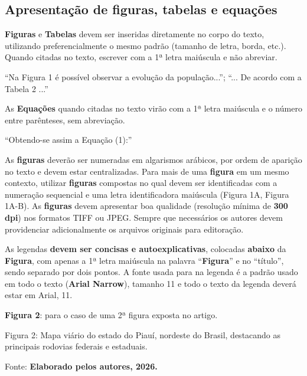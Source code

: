 
\subsection{Apresentação de figuras, tabelas e equações}

\textbf{Figuras} e \textbf{Tabelas} devem ser inseridas diretamente no corpo do texto, utilizando preferencialmente o mesmo padrão (tamanho de letra, borda, etc.). Quando citadas no texto, escrever com a 1ª letra maiúscula e não abreviar.

``Na Figura 1 é possível observar a evolução da população...''; ``... De acordo com a Tabela 2 ...''

As \textbf{Equações} quando citadas no texto virão com a 1ª letra maiúscula e o número entre parênteses, sem abreviação.

``Obtendo-se assim a Equação (1):''

As \textbf{figuras} deverão ser numeradas em algarismos arábicos, por ordem de aparição no texto e devem estar centralizadas. Para mais de uma \textbf{figura} em um mesmo contexto, utilizar \textbf{figuras} compostas no qual devem ser identificadas com a numeração sequencial e uma letra identificadora maiúscula (Figura 1A, Figura 1A-B). As \textbf{figuras} devem apresentar boa qualidade (resolução mínima de \textbf{300 dpi}) nos formatos TIFF ou JPEG. Sempre que necessários os autores devem providenciar adicionalmente os arquivos originais para editoração.

As legendas \textbf{devem ser concisas e autoexplicativas}, colocadas \textbf{abaixo} da \textbf{Figura}, com apenas a 1ª letra maiúscula na palavra ``\textbf{Figura}'' e no ``título'', sendo separado por dois pontos. A fonte usada para na legenda é a padrão usado em todo o texto (\textbf{Arial Narrow}), tamanho 11 e todo o texto da legenda deverá estar em Arial, 11.

\textbf{Figura 2}: para o caso de uma 2ª figura exposta no artigo.

Figura 2: Mapa viário do estado do Piauí, nordeste do Brasil, destacando as principais rodovias federais e estaduais.

\begin{figure}[htb]
    \centering
    \fbox{\rule{0pt}{2in} \rule{0.6\textwidth}{0pt}}
\end{figure}

Fonte: \textbf{Elaborado pelos autores, 2026.}


